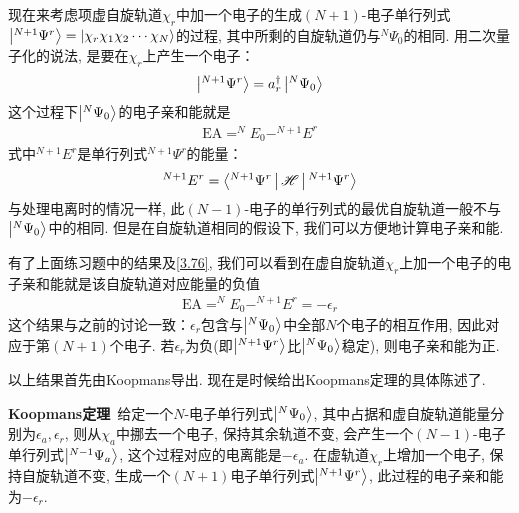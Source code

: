 
现在来考虑项虚自旋轨道$\chi_r$中加一个电子的生成$(N+1)$-电子单行列式$\Ket{^{N+1}\Psi^r}=\Ket{\chi_r\chi_1\chi_2\cdots\chi_N}$的过程, 
其中所剩的自旋轨道仍与$^N\Psi_0$的相同. 
用二次量子化的说法, 
是要在$\chi_r$上产生一个电子：
\begin{align}
	\Ket{^{N+1}\Psi^r} = a^\dagger_r\Ket{^N\Psi_0}
\end{align}
这个过程下$\Ket{^N\Psi_0}$的电子亲和能就是
\begin{align}
	\mathrm{EA} = ^NE_0 - ^{N+1}E^r
\end{align}
式中$ ^{N+1}E^r$是单行列式$^{N+1}\Psi^r$的能量：
\begin{align}
	^{N+1}E^r = \Braket{^{N+1}\Psi^r|\mathscr{H}|^{N+1}\Psi^r}
\end{align}
与处理电离时的情况一样, 
此$(N-1)$-电子的单行列式的最优自旋轨道一般不与$\Ket{^N\Psi_0}$中的相同. 
但是在自旋轨道相同的假设下, 
我们可以方便地计算电子亲和能.


有了上面练习题中的结果及\autoref{3.76}, 
我们可以看到在虚自旋轨道$\chi_r$上加一个电子的电子亲和能就是该自旋轨道对应能量的负值
\begin{align}
	\mathrm{EA} = ^{N}E_0 - ^{N+1}E^r = -\epsilon_r
\end{align}
这个结果与之前的讨论一致：$\epsilon_r$包含与$\Ket{^N\Psi_0}$中全部$N$个电子的相互作用, 
因此对应于第$(N+1)$个电子. 
若$\epsilon_r$为负(即$\Ket{^{N+1}\Psi^r}$比$\Ket{^N\Psi_0}$稳定), 
则电子亲和能为正.


以上结果首先由Koopmans导出. 
现在是时候给出Koopmans定理的具体陈述了.


\textbf{Koopmans定理}\ 给定一个$N$-电子\hft 单行列式$\Ket{^N\Psi_0}$, 其中占据和虚自旋轨道能量分别为$\epsilon_a,\epsilon_r$, 则从$\chi_a$中挪去一个电子, 保持其余轨道不变, 会产生一个$(N-1)$-电子单行列式$\Ket{^{N-1}\Psi_a}$, 这个过程对应的电离能是$-\epsilon_a$. 
在虚轨道$\chi_r$上增加一个电子, 保持自旋轨道不变, 生成一个$(N+1)$电子单行列式$\Ket{^{N+1}\Psi^r}$, 此过程的电子亲和能为$-\epsilon_r$.

